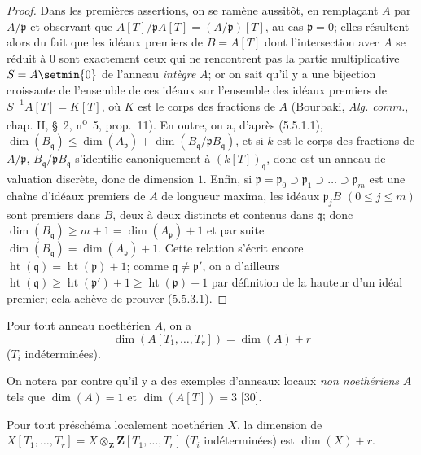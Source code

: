 \begin{proof}
Dans les premières assertions, on se ramène aussitôt, en remplaçant $A$ par
$A/\mathfrak p$ et observant que
$A[T]/\mathfrak pA[T]=(A/\mathfrak p)[T]$, au cas $\mathfrak p=0$; elles
résultent alors du fait que les idéaux premiers de $B=A[T]$ dont
l'intersection avec $A$ se réduit à $0$ sont exactement ceux qui ne
rencontrent pas la partie multiplicative $S=A\setmin\{0\}$ de l'anneau \emph{intègre}
$A$; or on sait qu'il y a une bijection croissante de l'ensemble de ces
idéaux sur l'ensemble des idéaux premiers de $S^{-1}A[T]=K[T]$, où $K$ est
le corps des fractions de $A$ (Bourbaki, \emph{Alg. comm.}, chap. II,
\S~2, n\textsuperscript{o}~5, prop.~11). En outre, on a, d'après (5.5.1.1),
$\dim(B_{\mathfrak q})\leq\dim(A_{\mathfrak p})
+\dim(B_{\mathfrak q}/\mathfrak pB_{\mathfrak q})$, et si $k$ est le corps des fractions de $A/\mathfrak p$,
$B_{\mathfrak q}/\mathfrak pB_{\mathfrak q}$ s'identifie canoniquement à
$(k[T])_{\mathfrak q}$, donc est un anneau de valuation discrète, donc de
dimension $1$. Enfin, si
$\mathfrak p=\mathfrak p_0\supset\mathfrak p_1\supset\ldots
\supset\mathfrak p_m$ est une chaîne d'idéaux premiers de $A$ de longueur
maxima, les idéaux $\mathfrak p_jB$ $(0\leq j\leq m)$ sont premiers dans
$B$, deux à deux distincts et contenus dans $\mathfrak q$; donc
$\dim(B_{\mathfrak q})\geq m+1=\dim(A_{\mathfrak p})+1$ et par suite
$\dim(B_{\mathfrak q})=\dim(A_{\mathfrak p})+1$. Cette relation s'écrit
encore $\operatorname{ht}(\mathfrak q)=\operatorname{ht}(\mathfrak p)+1$;
comme $\mathfrak q\ne\mathfrak p'$, on a d'ailleurs
$\operatorname{ht}(\mathfrak q)\geq\operatorname{ht}(\mathfrak p')+1
\geq\operatorname{ht}(\mathfrak p)+1$ par définition de la hauteur d'un
idéal premier; cela achève de prouver (5.5.3.1).
\end{proof}

\begin{corollary}[5.5.4]
Pour tout anneau noethérien $A$, on a
\begin{equation}
\dim(A[T_1,\ldots,T_r])=\dim(A)+r
\tag{5.5.4.1}\label{IV.2.s5.5.4.1-fr}
\end{equation}
($T_i$ indéterminées).
\end{corollary}

On notera par contre qu'il y a des exemples d'anneaux locaux \emph{non noethériens}
$A$ tels que $\dim(A)=1$ et $\dim(A[T])=3$ [30].

\begin{corollary}[5.5.5]
\label{IV.2.s5.5.5-fr}
Pour tout préschéma localement noethérien $X$, la dimension de
$X[T_1,\ldots,T_r]=X\otimes_{\mathbf Z}\mathbf Z[T_1,\ldots,T_r]$
($T_i$ indéterminées) est $\dim(X)+r$.
\end{corollary}

